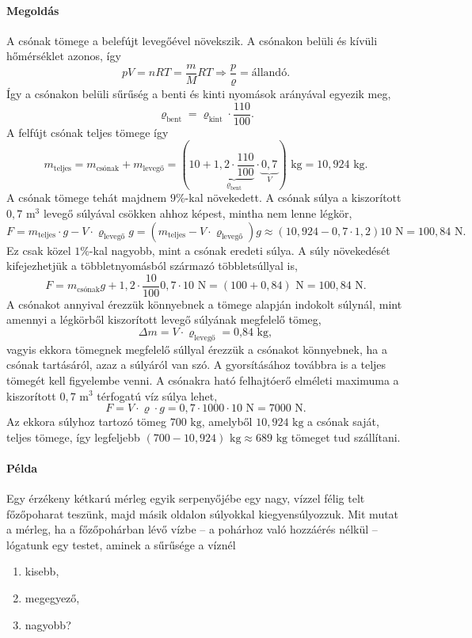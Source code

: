 \documentclass[12pt,a4paper]{scrartcl}
\begin{document}
\paragraph{Megoldás}
A csónak tömege a belefújt levegőével növekszik. A csónakon belüli és kívüli hőmérséklet azonos, így
\[pV = nRT = \frac{m}{M}RT \Rightarrow \frac{p}{\varrho } = {\text{állandó}}.\]
Így a csónakon belüli sűrűség a benti és kinti nyomások arányával egyezik meg,
\[{\varrho _{{\text{bent}}}} = {\varrho _{{\text{kint}}}} \cdot \frac{{110}}{{100}}.\]
A felfújt csónak teljes tömege így
\[{m_{{\text{teljes}}}} = {m_\text{csónak}} + {m_\text{levegő}} = \left( {10 + \underbrace {1{,}2 \cdot \frac{{110}}{{100}}}_{{\varrho _{{\text{bent}}}}} \cdot \underbrace {0{,}7}_V} \right){\text{ kg}} = 10{,}924{\text{ kg}}.\]
A csónak tömege tehát majdnem $9\%$-kal növekedett. A csónak súlya a kiszorított $0{,}7\text{ m}^3$ levegő súlyával csökken ahhoz képest, mintha nem lenne légkör,
\[F = {m_\text{teljes}} \cdot g - V \cdot {\varrho _\text{levegő}}g = \left( {{m_\text{teljes}} - V \cdot {\varrho _\text{levegő}}} \right)g \approx \left( {10{,}924 - 0{,}7 \cdot 1{,}2} \right)10{\text{ N}} = 100{,}84{\text{ N}}.\]
Ez csak közel $1\%$-kal nagyobb, mint a csónak eredeti súlya. A súly növekedését kifejezhetjük a többletnyomásból származó többletsúllyal is,
\[F = m_\text{csónak}g + 1{,}2 \cdot \frac{{10}}{{100}}0{,}7 \cdot 10{\text{ N}} = \left( {100 + 0{,}84} \right){\text{ N}} = 100{,}84{\text{ N}}.\]
A csónakot annyival érezzük könnyebnek a tömege alapján indokolt súlynál, mint amennyi a légkörből kiszorított levegő súlyának megfelelő tömeg,
\[\Delta m = V \cdot {\varrho _\text{levegő}} = {\text{0{,}84 kg}},\]
vagyis ekkora tömegnek megfelelő súllyal érezzük a csónakot könnyebnek, ha a csónak tartásáról, azaz a súlyáról van szó. A gyorsításához továbbra is a teljes tömegét kell figyelembe venni. A csónakra ható felhajtóerő elméleti maximuma a kiszorított $0{,}7\text{ m}^3$ térfogatú víz súlya lehet,
\[F = V \cdot \varrho  \cdot g = 0,7 \cdot 1000 \cdot 10{\text{ N}} = 7000{\text{ N}}.\]
Az ekkora súlyhoz tartozó tömeg $700\text{ kg}$, amelyből $10{,}924{\text{ kg}}$ a csónak saját, teljes tömege, így legfeljebb $\left( {700 - 10,924} \right){\text{ kg}} \approx 689{\text{ kg}}$ tömeget tud szállítani.

\paragraph{Példa}
Egy érzékeny kétkarú mérleg egyik serpenyőjébe egy nagy, vízzel félig telt főzőpoharat teszünk, majd másik oldalon súlyokkal kiegyensúlyozzuk. Mit mutat a mérleg, ha a főzőpohárban lévő vízbe -- a pohárhoz való hozzáérés nélkül -- lógatunk egy testet, aminek a sűrűsége a víznél
\begin{enumerate}
\item kisebb,
\item megegyező,
\item nagyobb?
\end{enumerate}
\end{document}
